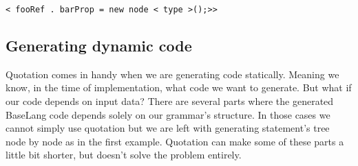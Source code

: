 \begin{center}
	\texttt{\colorbox{cyan!30}{<}\lexerrule{\%(} fooRef \lexerrule{)\%}.\lexerrule{\%(} barProp \lexerrule{)\%} = new node <\lexerrule{\textasciicircum(} type \lexerrule{)\textasciicircum}>();>\colorbox{cyan!30}{>}}
\end{center}

\subsection{Generating dynamic code}

Quotation comes in handy when we are generating code statically. Meaning we know, in the time of implementation, what code we want to generate. But what if our code depends on input data? There are several parts where the generated BaseLang code depends solely on our grammar's structure. In those cases we cannot simply use quotation but we are left with generating statement's tree node by node as in the first example. Quotation can make some of these parts a little bit shorter, but doesn't solve the problem entirely.
